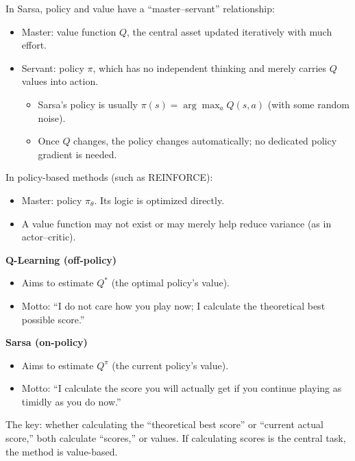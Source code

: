 In Sarsa, policy and value have a ``master--servant'' relationship:

\begin{itemize}
\tightlist
\item
  Master: value function \(Q\), the central asset updated iteratively with much effort.
\item
  Servant: policy \(\pi\), which has no independent thinking and merely carries \(Q\) values into action.

  \begin{itemize}
  \tightlist
  \item
    Sarsa's policy is usually \(\pi(s)=\arg\max_a Q(s,a)\) (with some random noise).
  \item
    Once \(Q\) changes, the policy changes automatically; no dedicated policy gradient is needed.
  \end{itemize}
\end{itemize}

In policy-based methods (such as REINFORCE):

\begin{itemize}
\tightlist
\item
  Master: policy \(\pi_\theta\). Its logic is optimized directly.
\item
  A value function may not exist or may merely help reduce variance (as in actor--critic).
\end{itemize}

\textbf{Q-Learning (off-policy)}

\begin{itemize}
\tightlist
\item
  Aims to estimate \(Q^*\) (the optimal policy's value).
\item
  Motto: ``I do not care how you play now; I calculate the theoretical best possible score.''
\end{itemize}

\textbf{Sarsa (on-policy)}

\begin{itemize}
\tightlist
\item
  Aims to estimate \(Q^\pi\) (the current policy's value).
\item
  Motto: ``I calculate the score you will actually get if you continue playing as timidly as you do now.''
\end{itemize}

The key: whether calculating the ``theoretical best score'' or ``current actual score,'' both calculate ``scores,'' or values. If calculating scores is the central task, the method is value-based.

